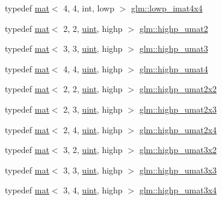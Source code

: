 \begin{DoxyCompactItemize}
typedef \hyperlink{structglm_1_1mat}{mat}$<$ 4, 4, int, lowp $>$ \hyperlink{group__gtc__matrix__integer_ga788e6fa0d6ba756ae9fc758099c57f85}{glm\+::lowp\+\_\+imat4x4}
\item 
typedef \hyperlink{structglm_1_1mat}{mat}$<$ 2, 2, \hyperlink{group__core__precision_ga4fd29415871152bfb5abd588334147c8}{uint}, highp $>$ \hyperlink{group__gtc__matrix__integer_ga0788642172aac0bb6c4c16750c92ed96}{glm\+::highp\+\_\+umat2}
\item 
typedef \hyperlink{structglm_1_1mat}{mat}$<$ 3, 3, \hyperlink{group__core__precision_ga4fd29415871152bfb5abd588334147c8}{uint}, highp $>$ \hyperlink{group__gtc__matrix__integer_ga2718f6f3a37cd13e75e6839a8a5f2355}{glm\+::highp\+\_\+umat3}
\item 
typedef \hyperlink{structglm_1_1mat}{mat}$<$ 4, 4, \hyperlink{group__core__precision_ga4fd29415871152bfb5abd588334147c8}{uint}, highp $>$ \hyperlink{group__gtc__matrix__integer_ga9bc7b9ba044449b412119fa68cf11b20}{glm\+::highp\+\_\+umat4}
\item 
typedef \hyperlink{structglm_1_1mat}{mat}$<$ 2, 2, \hyperlink{group__core__precision_ga4fd29415871152bfb5abd588334147c8}{uint}, highp $>$ \hyperlink{group__gtc__matrix__integer_ga21045c3ef9df4966779713fa1a7b4b52}{glm\+::highp\+\_\+umat2x2}
\item 
typedef \hyperlink{structglm_1_1mat}{mat}$<$ 2, 3, \hyperlink{group__core__precision_ga4fd29415871152bfb5abd588334147c8}{uint}, highp $>$ \hyperlink{group__gtc__matrix__integer_ga0264db97a9144fa08315b5a4f455872f}{glm\+::highp\+\_\+umat2x3}
\item 
typedef \hyperlink{structglm_1_1mat}{mat}$<$ 2, 4, \hyperlink{group__core__precision_ga4fd29415871152bfb5abd588334147c8}{uint}, highp $>$ \hyperlink{group__gtc__matrix__integer_ga451e726ea1f020c97b2f8aa41242055b}{glm\+::highp\+\_\+umat2x4}
\item 
typedef \hyperlink{structglm_1_1mat}{mat}$<$ 3, 2, \hyperlink{group__core__precision_ga4fd29415871152bfb5abd588334147c8}{uint}, highp $>$ \hyperlink{group__gtc__matrix__integer_ga91ed05f00d470b2448e024af7e244f49}{glm\+::highp\+\_\+umat3x2}
\item 
typedef \hyperlink{structglm_1_1mat}{mat}$<$ 3, 3, \hyperlink{group__core__precision_ga4fd29415871152bfb5abd588334147c8}{uint}, highp $>$ \hyperlink{group__gtc__matrix__integer_gaa389f5f7427d2578424ddc12ce120af3}{glm\+::highp\+\_\+umat3x3}
\item 
typedef \hyperlink{structglm_1_1mat}{mat}$<$ 3, 4, \hyperlink{group__core__precision_ga4fd29415871152bfb5abd588334147c8}{uint}, highp $>$ \hyperlink{group__gtc__matrix__integer_ga6df8a72a571bcd26ade637bf069b5562}{glm\+::highp\+\_\+umat3x4}

\end{DoxyCompactItemize}
